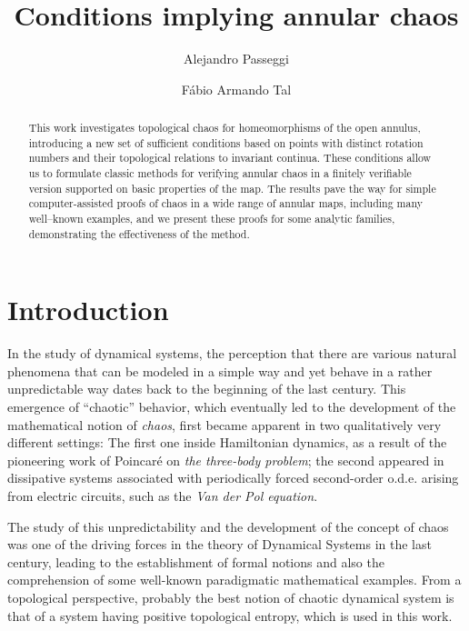 \documentclass[12pt,a4paper]{amsart}
\title[Conditions implying Annular Chaos]{Conditions implying annular chaos}
\author{Alejandro Passeggi}
\author{F\'{a}bio Armando Tal}
\theoremstyle{definition}
\theoremstyle{remark}
\begin{document}
\maketitle

\begin{abstract}

This work investigates topological chaos for homeomorphisms of the open annulus, introducing a new set of sufficient conditions based on points with distinct rotation numbers and their topological relations to  invariant continua. These conditions allow us to formulate classic methods for verifying annular chaos in a finitely verifiable version supported on basic properties of the map. The results pave the way for simple computer-assisted proofs of chaos in a wide range of annular maps, including many well--known examples, and we present these proofs
for some analytic families, demonstrating the effectiveness of the method.


\end{abstract}

\section{Introduction}\label{s.intro}

In the study of dynamical systems, the perception that there are various natural phenomena that can be modeled in a simple way and yet behave in a rather unpredictable way dates back to the beginning of the last century. This emergence of ``chaotic'' behavior, which eventually led to the development of the mathematical notion of \emph{chaos}, first became apparent in two qualitatively very different settings: The first one inside Hamiltonian dynamics, as a result of the pioneering work of Poincar\'{e} on \emph{the three-body problem}; the second appeared in dissipative systems associated with periodically forced second-order o.d.e. arising from electric circuits, such as the
\emph{Van der Pol equation}. 

The study of this unpredictability and the development of the concept of chaos was one of the driving forces in the theory of Dynamical Systems in the last century, leading to the establishment of formal notions and also the comprehension of some well-known paradigmatic mathematical examples. From a topological perspective, probably the best notion of chaotic dynamical system is that of a system having positive topological entropy, which is used in this work.
\end{document}
